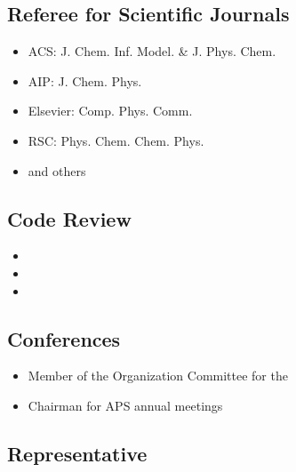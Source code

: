 \documentclass{article}
\begin{document}
\subsection*{Referee for Scientific Journals}

\begin{itemize}
\setlength{\itemsep}{0pt}
\setlength{\parskip}{0pt}
\setlength{\parsep}{0pt}
\item ACS: J. Chem. Inf. Model. \& J. Phys. Chem.
\item AIP: J. Chem. Phys.
\item Elsevier: Comp. Phys. Comm.
\item RSC: Phys. Chem. Chem. Phys.
\item and others
\end{itemize}

\vspace{3mm}
\subsection*{Code Review}

\begin{itemize}
\setlength{\itemsep}{0pt}
\setlength{\parskip}{0pt}
\setlength{\parsep}{0pt}
\item {}
\item {}
\item {}
\end{itemize}

\subsection*{Conferences}

\begin{itemize}
\setlength{\itemsep}{0pt}
\setlength{\parskip}{0pt}
\setlength{\parsep}{0pt}
\item Member of the Organization Committee for the 
\item Chairman for APS annual meetings
\end{itemize}

\subsection*{Representative}
\end{document}
